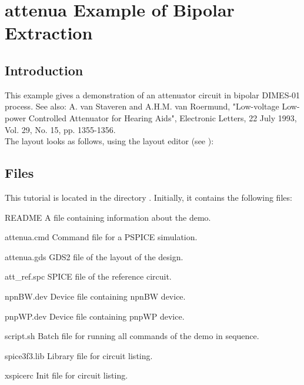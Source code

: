 \chapter{attenua Example of Bipolar Extraction}
\section{Introduction}
\label{PEintro}
This example gives a demonstration of an attenuator circuit in bipolar DIMES-01 process.
See also: A. van Staveren and A.H.M. van Roermund,
"Low-voltage Low-power Controlled Attenuator for Hearing Aids",
Electronic Letters, 22 July 1993, Vol. 29, No. 15, pp. 1355-1356.
\\[1 ex]
The layout looks as follows, using the layout editor  (see ):

\begin{figure}[h]
\centerline{}
\end{figure}

\section{Files}
This tutorial is located in the directory .
Initially, it contains the following files:
\begin{filelist}
\item[README] A file containing information about the demo.
\item[attenua.cmd] Command file for a PSPICE simulation.
\item[attenua.gds] GDS2 file of the layout of the design.
\item[att\_ref.spc] SPICE file of the reference circuit.
\item[npnBW.dev] Device file containing npnBW device.
\item[pnpWP.dev] Device file containing pnpWP device.
\item[script.sh] Batch file for running all commands of the demo in sequence.
\item[spice3f3.lib] Library file for circuit listing.
\item[xspicerc] Init file for circuit listing.
\end{filelist}

